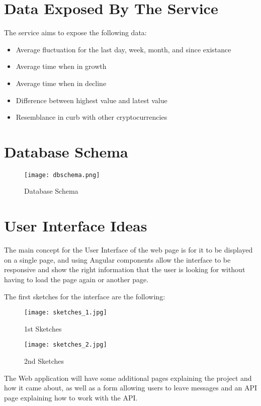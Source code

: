 \section{Data Exposed By The Service}
The service aims to expose the following data:
\begin{itemize}
    \item Average fluctuation for the last day, week, month, and since existance
    \item Average time when in growth
    \item Average time when in decline
    \item Difference between highest value and latest value
    \item Resemblance in curb with other cryptocurrencies
\end{itemize}
\section{Database Schema}
\begin{figure}
  \caption{Database Schema}
  \centering
  \texttt{[image: dbschema.png]}
\end{figure}


\section{User Interface Ideas}
The main concept for the User Interface of the web page is for it to be displayed on a single page, and using Angular components allow the interface to be responsive and show the right information that the user is looking for without having to load the page again or another page.

The first sketches for the interface are the following:
\begin{figure}
    \caption{1st Sketches}
    \centering
    \texttt{[image: sketches\_1.jpg]}
\end{figure}
\begin{figure}
    \caption{2nd Sketches}
    \centering
    \texttt{[image: sketches\_2.jpg]}
\end{figure}

The Web application will have some additional pages explaining the project and how it came about, as well as a form allowing users to leave messages and an API page explaining how to work with the API.

